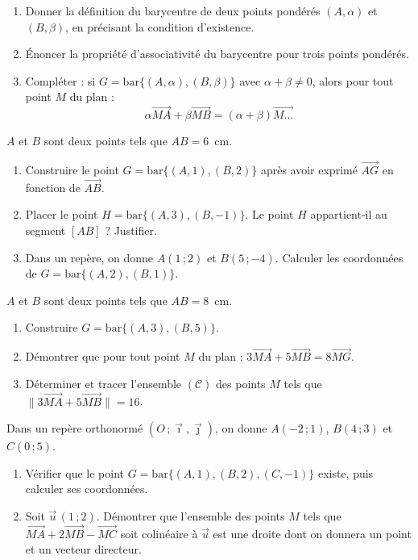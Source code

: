 \documentclass[11pt]{article}
\newcommand{\cle}[1]{{\popxbold\color{popdark}#1}}
\newcounter{popsec}
\newcounter{popsub}
\newcommand{\courssub}[1]{%
  \stepcounter{popsub}%
  \par\vspace{9pt}\noindent{\popxbold\fontsize{11.5}{13}\selectfont\color{popink}{\color{poporange}\thepopsec.\thepopsub}\hspace{6pt}#1}\par\nopagebreak\vspace{4pt}
}
\begin{document}
\begin{exercice}
\begin{enumerate}
\item Donner la définition du barycentre de deux points pondérés $(A,\alpha)$ et $(B,\beta)$, en précisant la condition d'existence.
\item Énoncer la propriété d'\cle{associativité} du barycentre pour trois points pondérés.
\item Compléter : si $G=\mathrm{bar}\{(A,\alpha),(B,\beta)\}$ avec $\alpha+\beta\neq 0$, alors pour tout point $M$ du plan :
\[ \alpha\overrightarrow{MA}+\beta\overrightarrow{MB} = (\alpha+\beta)\overrightarrow{M\ldots} \]
\end{enumerate}
\end{exercice}

\begin{exercice}
$A$ et $B$ sont deux points tels que $AB=6$~cm.
\begin{enumerate}
\item Construire le point $G=\mathrm{bar}\{(A,1),(B,2)\}$ après avoir exprimé $\overrightarrow{AG}$ en fonction de $\overrightarrow{AB}$.
\item Placer le point $H=\mathrm{bar}\{(A,3),(B,-1)\}$. Le point $H$ appartient-il au segment $[AB]$ ? Justifier.
\item Dans un repère, on donne $A(1\,;2)$ et $B(5\,;-4)$. Calculer les coordonnées de $G=\mathrm{bar}\{(A,2),(B,1)\}$.
\end{enumerate}
\end{exercice}

\courssub{Je m'entraîne}

\begin{exercice}
$A$ et $B$ sont deux points tels que $AB=8$~cm.
\begin{enumerate}
\item Construire $G=\mathrm{bar}\{(A,3),(B,5)\}$.
\item Démontrer que pour tout point $M$ du plan : $3\overrightarrow{MA}+5\overrightarrow{MB}=8\overrightarrow{MG}$.
\item Déterminer et tracer l'ensemble $(\mathcal{C})$ des points $M$ tels que $\|3\overrightarrow{MA}+5\overrightarrow{MB}\|=16$.
\end{enumerate}
\end{exercice}

\begin{exercice}
Dans un repère orthonormé $(O\,;\vec{\imath},\vec{\jmath})$, on donne $A(-2\,;1)$, $B(4\,;3)$ et $C(0\,;5)$.
\begin{enumerate}
\item Vérifier que le point $G=\mathrm{bar}\{(A,1),(B,2),(C,-1)\}$ existe, puis calculer ses coordonnées.
\item Soit $\vec{u}\,(1\,;2)$. Démontrer que l'ensemble des points $M$ tels que $\overrightarrow{MA}+2\overrightarrow{MB}-\overrightarrow{MC}$ soit colinéaire à $\vec{u}$ est une droite dont on donnera un point et un vecteur directeur.
\end{enumerate}
\end{exercice}
\end{document}
